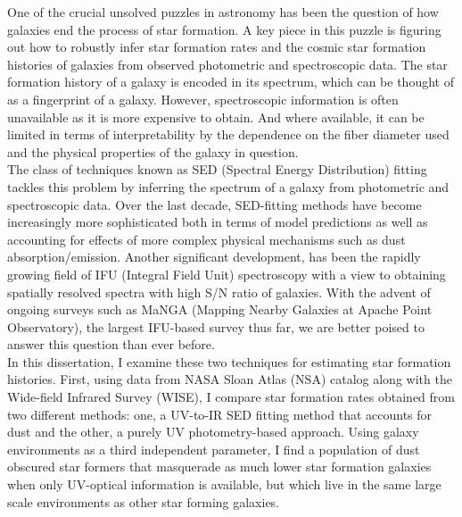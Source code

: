 
\doublespacing
One of the crucial unsolved puzzles in astronomy has been the question of how galaxies end the process of star formation. A key piece in this puzzle is figuring out how to robustly infer star formation rates and the cosmic star formation histories of galaxies from observed photometric and spectroscopic data. The star formation history of a galaxy is encoded in its spectrum, which can be thought of as a fingerprint of a galaxy. However, spectroscopic information is often unavailable as it is more expensive to obtain. And where available, it can be limited in terms of interpretability by the dependence on the fiber diameter used and the physical properties of the galaxy in question.\\

The class of techniques known as SED (Spectral Energy Distribution) fitting tackles this problem by inferring the spectrum of a galaxy from photometric and spectroscopic data. Over the last decade, SED-fitting methods have become increasingly more sophisticated both in terms of model predictions as well as accounting for effects of more complex physical mechanisms such as dust absorption/emission. Another significant development, has been the rapidly growing field of IFU (Integral Field Unit) spectroscopy with a view to obtaining spatially resolved spectra with high S/N ratio of galaxies. With the advent of ongoing surveys such as MaNGA (Mapping Nearby Galaxies at Apache Point Observatory), the largest IFU-based survey thus far, we are better poised to answer this question than ever before.\\

In this dissertation, I examine these two techniques for estimating star formation histories. First, using data from NASA Sloan Atlas (NSA) catalog along with the Wide-field Infrared Survey (WISE), I compare star formation rates obtained from two different methods: one, a UV-to-IR SED fitting method that accounts for dust and the other, a  purely UV photometry-based approach. Using galaxy environments as a third independent parameter, I find a population of dust obscured star formers that masquerade as much lower star formation galaxies when only UV-optical information is available, but which live in the same large scale environments as other star forming galaxies.\\

